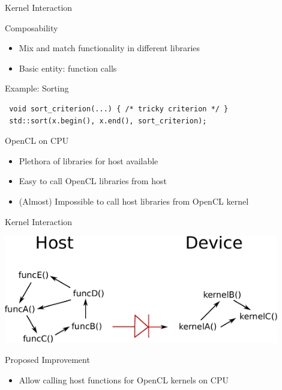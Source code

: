 


\begin{frame}[fragile]{Kernel Interaction}

 \begin{block}{Composability}
   \begin{itemize}
    \item Mix and match functionality in different libraries
    \item Basic entity: function calls
   \end{itemize}
 \end{block}
 
 \begin{block}{Example: Sorting}
  \begin{lstlisting}
 void sort_criterion(...) { /* tricky criterion */ }
 std::sort(x.begin(), x.end(), sort_criterion);
  \end{lstlisting}
 \end{block}

  \begin{block}{OpenCL on CPU}
   \begin{itemize}
    \item Plethora of libraries for host available
    \item Easy to call OpenCL libraries from host
    \item (Almost) Impossible to call host libraries from OpenCL kernel
   \end{itemize}
 \end{block}
 
\end{frame}



\begin{frame}[fragile]{Kernel Interaction}

\begin{center}
  \includegraphics[width=0.9\textwidth]{figures/diode}
\end{center}

 \begin{block}{Proposed Improvement}
   \begin{itemize}
    \item Allow calling host functions for OpenCL kernels on CPU
   \end{itemize}
 \end{block}
  
\end{frame}
